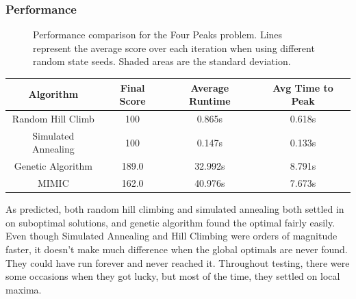 \documentclass[
	letterpaper, %
]{mlreport}
\begin{document}
\subsubsection{Performance}
\begin{figure}
	\centering
	{}
	\caption{Performance comparison for the Four Peaks problem. Lines represent the average score over each iteration when using different random state seeds. Shaded areas are the standard deviation.}
	\label{fig:fig1}
\end{figure}
\begin{center}
	\begin{tabular}{|c||c|c|c|}
	 \hline
	 Algorithm & Final Score & Average Runtime & Avg Time to Peak \\
	 \hline\hline
	 Random Hill Climb & 100 & 0.865s & 0.618s  \\
	 \hline
	 Simulated Annealing & 100 & 0.147s & 0.133s  \\
	 \hline
	 Genetic Algorithm & 189.0 & 32.992s & 8.791s  \\
	 \hline
	 MIMIC & 162.0 & 40.976s & 7.673s  \\
	 \hline
	\end{tabular}
	\label{table:table1}
\end{center}
As predicted, both random hill climbing and simulated annealing both settled in on suboptimal solutions, and genetic algorithm found the optimal fairly easily. Even though Simulated Annealing and Hill Climbing were orders of magnitude faster, it doesn't make much difference when the global optimals are never found. They could have run forever and never reached it. Throughout testing, there were some occasions when they got lucky, but most of the time, they settled on local maxima.
\end{document}
